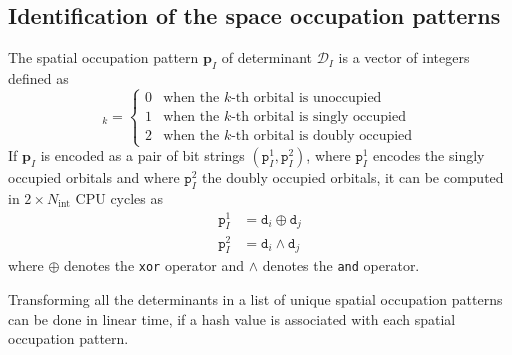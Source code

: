 \documentclass[aip,jcp,reprint,showkeys]{revtex4-1}
\newcommand{\mb}{\mathtt{b}}
\newcommand{\md}{\mathtt{d}}
\newcommand{\mD}{\mathcal{D}}
\newcommand{\mpp}{\mathtt{p}}
\newcommand{\mpv}{\mathbf{p}}
\newcommand{\Nint}{{N_\text{int}}}
\newcommand{\Norb}{{N_\text{orb}}}
\newcommand{\sop}{spatial occupation pattern}
\begin{document}

\subsection{Identification of the space occupation patterns}

The {\sop} $\mpv_I$ of determinant $\mD_I$ 
is a vector of integers defined as
\begin{equation}
  [\mpv_I]_k = 
  \begin{cases} 
    0 & \text{when the $k$-th orbital is unoccupied} \\
    1 & \text{when the $k$-th orbital is singly occupied} \\
    2 & \text{when the $k$-th orbital is doubly occupied}
  \end{cases} 
\end{equation}
If $\mpv_I$ is encoded as a pair of bit strings $(\mpp_I^1, \mpp_I^2)$, where
$\mpp_I^1$ encodes the singly occupied orbitals and where $\mpp_I^2$ the doubly
occupied orbitals, it can be computed in $2\times\Nint$ CPU cycles as
\begin{align}
  \mpp_I^1 & = \md_i \oplus \md_j \\
  \mpp_I^2 & = \md_i \wedge \md_j 
\end{align}
where $\oplus$ denotes the \texttt{xor} operator and $\wedge$ denotes the
\texttt{and} operator.

Transforming all the determinants in a list of unique \sop s can be done
in linear time, if a hash value is associated with each \sop .\cite{Bitton_1983}
\end{document}
